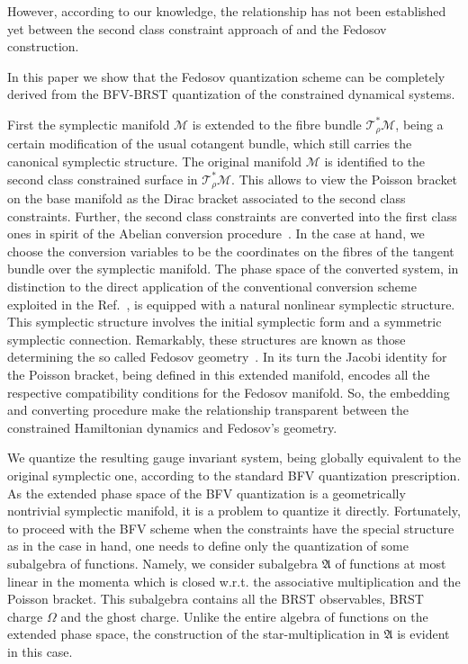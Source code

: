 \documentclass[a4paper,11pt,oneside]{amsart}
\theoremstyle{plain}
\numberwithin{equation}{section} %
\numberwithin{figure}{section} %
\def\mod{{\mathcal T}^*_\rho}
\def\manM{{\mathcal M}}
\def\aA{{ \mathfrak A}}
\begin{document}
\noindent
However, according to our knowledge,  the relationship has not been
established yet between the second class constraint approach of
\cite{[BF89],[FL],[BFF]} and the Fedosov construction.

\noindent
In this paper we show that the Fedosov quantization scheme
can be completely derived from the BFV-BRST quantization of the
constrained dynamical systems.

\noindent
First the symplectic manifold $\manM$ is extended to the fibre bundle
$\mod\manM$, being a certain modification of the usual cotangent
bundle, which still carries the canonical symplectic structure.  The
original manifold $\manM$ is identified to the second class
constrained surface in $\mod\manM$.  This allows to view the
Poisson bracket on the base manifold as the Dirac bracket associated
to the second class constraints.  Further, the second class
constraints are converted into the first class ones in spirit of the
Abelian conversion procedure~\cite{[BT]}.  In the case at hand, we
choose the conversion variables to be the coordinates on the fibres
of the tangent bundle over the symplectic manifold.  The phase space
of the converted system, in distinction to the direct application of
the conventional conversion scheme~\cite{[BT]} exploited in the
Ref.~\cite{[FL]}, is equipped with a natural nonlinear symplectic
structure.  This symplectic structure involves the initial symplectic
form and a symmetric symplectic connection.  Remarkably,
these structures are known as those determining the so called
Fedosov geometry~\cite{[GRS]}.  In its turn the Jacobi identity
for the Poisson bracket, being defined in this extended manifold, encodes
all the respective compatibility conditions for the Fedosov manifold. So,
the embedding and converting procedure make the relationship
transparent between the constrained Hamiltonian dynamics and
Fedosov's geometry.

\noindent
We quantize the resulting  gauge invariant system, being globally
equivalent to the original symplectic one, according to the standard BFV
quantization prescription.  As the extended phase space of the BFV
quantization is a geometrically nontrivial symplectic manifold, it is a
problem to quantize it directly.  Fortunately, to proceed with the
BFV scheme when the constraints have the special structure as in the case
in hand, one needs to define only the quantization of
some subalgebra of functions.  Namely, we consider subalgebra $\aA$
of functions at most linear in the momenta which is closed w.r.t.
the associative multiplication and the Poisson bracket.  This
subalgebra contains all the BRST observables, BRST charge $\Omega$ and
the ghost charge.  Unlike the entire algebra of functions on the
extended phase space, the construction of the star-multiplication
in $\aA$ is evident in this case.
\end{document}
